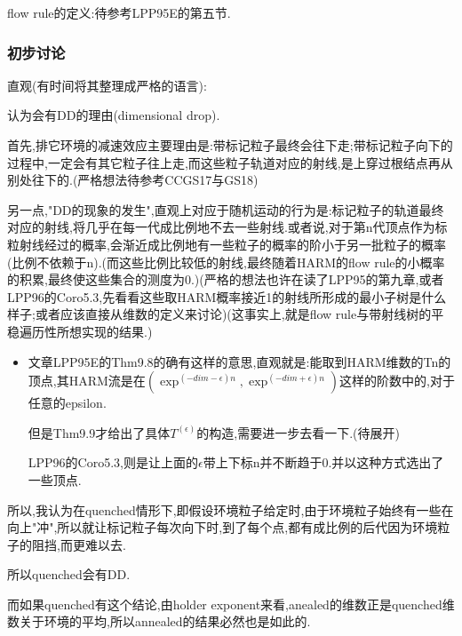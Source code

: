 \documentclass[a4paper,oneside]{ctexbook}
\begin{document}
			flow rule的定义:待参考LPP95E的第五节.

		\subsubsection*{初步讨论}

			直观(有时间将其整理成严格的语言):

				\begin{conjec}

					认为会有DD的理由(dimensional drop).

					首先,排它环境的减速效应主要理由是:带标记粒子最终会往下走;带标记粒子向下的过程中,一定会有其它粒子往上走,而这些粒子轨道对应的射线,是上穿过根结点再从别处往下的.(严格想法待参考CCGS17与GS18)

					另一点,"DD的现象的发生",直观上对应于随机运动的行为是:标记粒子的轨道最终对应的射线,将几乎在每一代成比例地不去一些射线.或者说,对于第n代顶点作为标粒射线经过的概率,会渐近成比例地有一些粒子的概率的阶小于另一批粒子的概率(比例不依赖于n).(而这些比例比较低的射线,最终随着HARM的flow rule的小概率的积累,最终使这些集合的测度为0.)(严格的想法也许在读了LPP95的第九章,或者LPP96的Coro5.3,先看看这些取HARM概率接近1的射线所形成的最小子树是什么样子;或者应该直接从维数的定义来讨论)(这事实上,就是flow rule与带射线树的平稳遍历性所想实现的结果.)

						\begin{itemize}
							\item 

							文章LPP95E的Thm9.8的确有这样的意思,直观就是:能取到HARM维数的Tn的顶点,其HARM流是在$(\exp^{(-dim-\epsilon)n},\exp^{(-dim+\epsilon)n})$这样的阶数中的,对于任意的epsilon.

							但是Thm9.9才给出了具体$T^(\epsilon)$的构造,需要进一步去看一下.(待展开)

							LPP96的Coro5.3,则是让上面的$\epsilon$带上下标n并不断趋于0.并以这种方式选出了一些顶点.
						\end{itemize}

					所以,我认为在quenched情形下,即假设环境粒子给定时,由于环境粒子始终有一些在向上"冲",所以就让标记粒子每次向下时,到了每个点,都有成比例的后代因为环境粒子的阻挡,而更难以去.

					所以quenched会有DD.

					而如果quenched有这个结论,由holder exponent来看,anealed的维数正是quenched维数关于环境的平均,所以annealed的结果必然也是如此的.
				\end{conjec}
\end{document}
